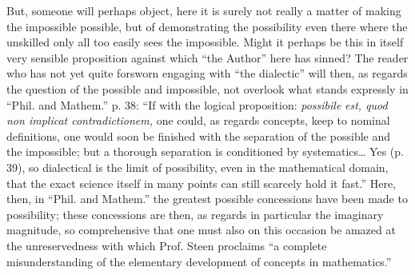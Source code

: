 \documentclass[12pt,a4paper,openany]{book}
\begin{document}
But, someone will perhaps object, here it is surely not really
a matter of making the impossible possible, but of
demonstrating the possibility even there where the unskilled only
all too easily sees the impossible. Might it perhaps be
this in itself very sensible proposition against which ``the Author'' here has
sinned? The reader who has not yet quite
forsworn engaging with ``the dialectic'' will then, as regards
the question of the possible and impossible, not overlook what stands expressly in ``Phil. and Mathem.''
p. 38: ``If with the logical proposition: \textit{possibile}
\textit{est, quod non implicat contradictionem,} one could, as regards concepts, keep to nominal definitions, one would
soon be finished with the separation of the possible and
the impossible; but a thorough separation is conditioned by
systematics\dots{} Yes (p. 39), so dialectical is the limit of possibility, even in the mathematical domain, that
the exact science itself in many points can still scarcely hold it fast.'' Here, then, in ``Phil. and
Mathem.'' the greatest possible concessions have been made to possibility; these concessions are then, as regards in particular the imaginary magnitude, so comprehensive that one must also on
this occasion be amazed at the unreservedness
with which Prof. Steen proclaims ``a complete
misunderstanding of the elementary development of concepts in mathematics.''
\end{document}
